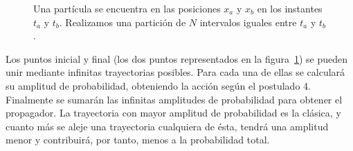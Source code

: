 \begin{figure}[ht]
  \centering
  \begin{minipage}{0.99\linewidth}
\end{minipage}
\caption{Una partícula se encuentra en las posiciones $x_a$ y $x_b$ en
  los instantes $t_a$ y $t_b$. Realizamos una partición de $N$
  intervalos iguales entre $t_a$ y $t_b$.}
\label{fig:path_integral_blank}
\end{figure}

Los puntos inicial y final (los dos puntos representados en la
figura~\ref{fig:path_integral_blank}) se pueden unir mediante
infinitas trayectorias posibles. Para cada una de ellas se calculará
su amplitud de probabilidad, obteniendo la acción según el postulado
4. Finalmente se sumarán las infinitas amplitudes de probabilidad para
obtener el propagador. La trayectoria con mayor amplitud de
probabilidad es la clásica, y cuanto más se aleje una trayectoria
cualquiera de ésta, tendrá una amplitud menor y contribuirá, por
tanto, menos a la probabilidad total.

